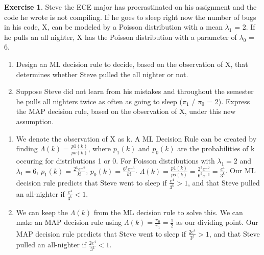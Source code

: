 \documentclass[12pt]{amsart}
\theoremstyle{definition}
\newtheorem{exercise}{Exercise}
\numberwithin{equation}{section}
\theoremstyle{plain}
\begin{document}
 

\begin{exercise}
Steve the ECE major has procrastinated on his assignment and the code he wrote is not compiling. If he goes to sleep right now the number of bugs in his code, X, can be modeled by a Poisson distribution with a mean $\lambda_1$ = 2. If he pulls an all nighter, X has the Poisson distribution with a parameter of $\lambda_0$ = 6. 
\begin{enumerate}
    \item Design an ML decision rule to decide, based on the observation of X, that determines whether Steve pulled the all nighter or not.
    \item Suppose Steve did not learn from his mistakes and throughout the semester he pulls all nighters twice as often as going to sleep ($\pi_1$ / $\pi_0$ = 2). Express the MAP decision rule, based on the observation of X, under this new assumption. 
\end{enumerate}
\begin{answer}
\begin{enumerate}
    \item We denote the observation of X as k. A ML Decision Rule can be created by finding $\Lambda(k) = \frac{p1(k)}{po(k)}$, where $p_{1}(k)$ and $p_{0}(k)$ are the probabilities of k occuring for distributions 1 or 0. For Poisson distributions with $\lambda_{1} = 2$ and $\lambda_{1} = 6$, $p_{1}(k) = \frac{2^{k}e^{-2}}{k!}$, $p_{0}(k) = \frac{6^{k}e^{-6}}{k!}$. $\Lambda(k) = \frac{p1(k)}{po(k)} = \frac{2^{k}e^{-2}}{6^{k}e^{-6}} = \frac{e^4}{3^k}$. Our ML decision rule predicts that Steve went to sleep if $\frac{e^4}{3^k} > 1$, and that Steve pulled an all-nighter if  $\frac{e^4}{3^k} < 1$.
    \item We can keep the $\Lambda(k)$ from the ML decision rule to solve this. We can make an MAP decision rule using $\Lambda(k) = \frac{\pi_0}{\pi_1} = \frac{1}{2}$ as our dividing point. Our MAP decision rule predicts that Steve went to sleep if $\frac{2e^4}{3^k} > 1$, and that Steve pulled an all-nighter if  $\frac{2e^4}{3^k} < 1$.
\end{enumerate}
\end{answer}
\end{exercise}
\end{document}
